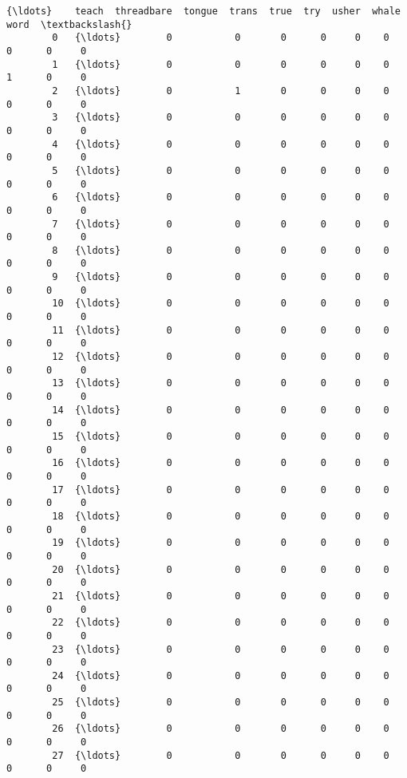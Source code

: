 \documentclass[11pt]{article}
\begin{document}
\begin{Verbatim}[commandchars=\\\{\}]
            {\ldots}    teach  threadbare  tongue  trans  true  try  usher  whale  word  \textbackslash{}
        0   {\ldots}        0           0       0      0     0    0      0      0     0   
        1   {\ldots}        0           0       0      0     0    0      1      0     0   
        2   {\ldots}        0           1       0      0     0    0      0      0     0   
        3   {\ldots}        0           0       0      0     0    0      0      0     0   
        4   {\ldots}        0           0       0      0     0    0      0      0     0   
        5   {\ldots}        0           0       0      0     0    0      0      0     0   
        6   {\ldots}        0           0       0      0     0    0      0      0     0   
        7   {\ldots}        0           0       0      0     0    0      0      0     0   
        8   {\ldots}        0           0       0      0     0    0      0      0     0   
        9   {\ldots}        0           0       0      0     0    0      0      0     0   
        10  {\ldots}        0           0       0      0     0    0      0      0     0   
        11  {\ldots}        0           0       0      0     0    0      0      0     0   
        12  {\ldots}        0           0       0      0     0    0      0      0     0   
        13  {\ldots}        0           0       0      0     0    0      0      0     0   
        14  {\ldots}        0           0       0      0     0    0      0      0     0   
        15  {\ldots}        0           0       0      0     0    0      0      0     0   
        16  {\ldots}        0           0       0      0     0    0      0      0     0   
        17  {\ldots}        0           0       0      0     0    0      0      0     0   
        18  {\ldots}        0           0       0      0     0    0      0      0     0   
        19  {\ldots}        0           0       0      0     0    0      0      0     0   
        20  {\ldots}        0           0       0      0     0    0      0      0     0   
        21  {\ldots}        0           0       0      0     0    0      0      0     0   
        22  {\ldots}        0           0       0      0     0    0      0      0     0   
        23  {\ldots}        0           0       0      0     0    0      0      0     0   
        24  {\ldots}        0           0       0      0     0    0      0      0     0   
        25  {\ldots}        0           0       0      0     0    0      0      0     0   
        26  {\ldots}        0           0       0      0     0    0      0      0     0   
        27  {\ldots}        0           0       0      0     0    0      0      0     0   

\end{Verbatim}
\end{document}

